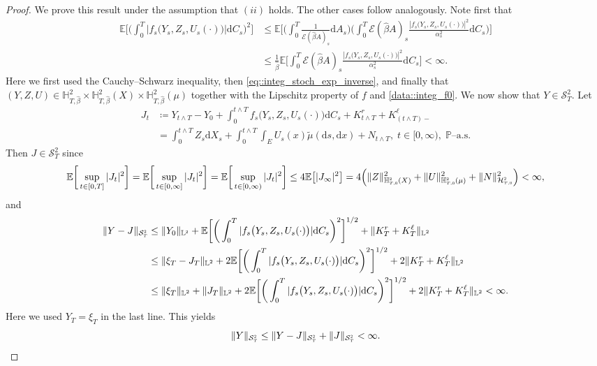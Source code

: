 \documentclass[10pt]{article} %
\newcommand\cE{\mathcal E}
\newcommand\cH{\mathcal H}
\newcommand\cS{\mathcal S}
\newcommand{\smalltext}[1]{\text{\fontsize{4}{4}\selectfont$#1$}}
\def \E{\mathbb{E}}
\def \H{\mathbb{H}}
\def \L{\mathbb{L}}
\def \P{\mathbb{P}}
\newcommand{\1}{\mathbf{1}}
\def\d{\mathrm{d}}
\begin{document}
\begin{proof}
	We prove this result under the assumption that $(ii)$ holds. The other cases follow analogously. Note first that 
	\begin{align*}
		\E\bigg[\bigg(\int_0^T |f_s\big(Y_s,Z_s,U_s(\cdot)\big)| \d C_s\bigg)^2\bigg] 
		&\leq \E\bigg[\bigg(\int_0^T\frac{1}{\cE(\hat\beta A)_{s}}\d A_s\bigg)\bigg(\int_0^T \cE(\hat\beta A)_{s}\frac{|f_s\big(Y_s,Z_s,U_s(\cdot)\big)|^2}{\alpha^2_s} \d C_s\bigg)\bigg] \\
		&\leq  \frac{1}{\hat\beta}\E\bigg[\int_0^T \cE(\hat\beta A)_{s}\frac{|f_s\big(Y_s,Z_s,U_s(\cdot)\big)|^2}{\alpha^2_s} \d C_s\bigg] < \infty.
	\end{align*}
	Here we first used the Cauchy--Schwarz inequality, then \eqref{eq::integ_stoch_exp_inverse}, and finally that $(Y,Z,U) \in \H^2_{T,\hat\beta} \times \H^2_{T,\hat\beta}(X) \times \H^2_{T,\hat\beta}(\mu)$ together with the Lipschitz property of $f$ and \ref{data::integ_f0}. We now show that $Y \in \cS^2_T$. Let
	\begin{align*}
		J_t 
		&\coloneqq Y_{t \land T} - Y_0 + \int_0^{t \land T} f_s\big(Y_s,Z_s,U_s(\cdot)\big)\d C_s + K^r_{t \land T} + K^\ell_{(t \land T)-} \\
		&= \int_0^{t \land T} Z_s \d X_s + \int_0^{t \land T}\int_E U_s(x)\tilde\mu(\d s, \d x) + N_{t \land T}, \; t \in [0,\infty), \; \text{$\P$--a.s.}
	\end{align*}
	Then $J \in \cS^2_T$ since
	\begin{equation*}
		\E\bigg[\sup_{t \in [0,T]}|J_t|^2\bigg] = \E\bigg[\sup_{t \in [0,\infty]}|J_t|^2\bigg] = \E\bigg[\sup_{t \in [0,\infty)}|J_t|^2\bigg] 
		\leq 4 \E\big[|J_\infty|^2\big] 
		= 4\Big(\|Z\|^2_{\H^\smalltext{2}_{\smalltext{T}\smalltext{,}\smalltext{0}}(X)} + \|U\|^2_{\H^\smalltext{2}_{\smalltext{T}\smalltext{,}\smalltext{0}}(\mu)} + \|N\|^2_{\cH^\smalltext{2}_{\smalltext{T}\smalltext{,}\smalltext{0}}}\Big) < \infty,
	\end{equation*}
	and
	\begin{align*}
		\|Y - J\|_{\cS^\smalltext{2}_\smalltext{T}} 
		&\leq \|Y_0\|_{\L^\smalltext{2}} + \E\bigg[\bigg(\int_0^T |f_s\big(Y_s,Z_s,U_s(\cdot)\big)| \d C_s\bigg)^2\bigg]^{1/2} + \|K^r_T + K^\ell_T\|_{\L^2} \\
		&\leq \|\xi_T - J_T\|_{\L^2} + 2 \E\bigg[\bigg(\int_0^T |f_s\big(Y_s,Z_s,U_s(\cdot)\big)| \d C_s\bigg)^2\bigg]^{1/2} + 2 \|K^r_T + K^\ell_T\|_{\L^2} \\
		&\leq \|\xi_T\|_{\L^2} + \|J_T\|_{\L^2} + 2 \E\bigg[\bigg(\int_0^T |f_s\big(Y_s,Z_s,U_s(\cdot)\big)| \d C_s\bigg)^2\bigg]^{1/2} + 2 \|K^r_T + K^\ell_T\|_{\L^2} < \infty.
	\end{align*}
	Here we used $Y_T = \xi_T$ in the last line. This yields
	\begin{equation*}
		\|Y\|_{\cS^\smalltext{2}_\smalltext{T}} \leq \|Y - J\|_{\cS^\smalltext{2}_\smalltext{T}} + \|J\|_{\cS^\smalltext{2}_\smalltext{T}} < \infty.
	\end{equation*}
	


\end{proof}
\end{document}
